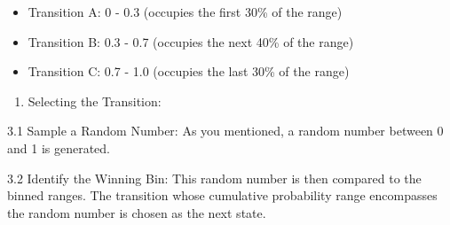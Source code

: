 \documentclass[
]{article}
\providecommand{\tightlist}{%
  \setlength{\itemsep}{0pt}\setlength{\parskip}{0pt}}
\begin{document}
\begin{itemize}
\tightlist
\item
  Transition A: 0 - 0.3 (occupies the first 30\% of the range)
\item
  Transition B: 0.3 - 0.7 (occupies the next 40\% of the range)
\item
  Transition C: 0.7 - 1.0 (occupies the last 30\% of the range)
\end{itemize}

\begin{enumerate}
\def\labelenumi{\arabic{enumi}.}
\setcounter{enumi}{2}
\tightlist
\item
  Selecting the Transition:
\end{enumerate}

3.1 Sample a Random Number: As you mentioned, a random number between 0
and 1 is generated.

3.2 Identify the Winning Bin: This random number is then compared to the
binned ranges. The transition whose cumulative probability range
encompasses the random number is chosen as the next state.
\end{document}
